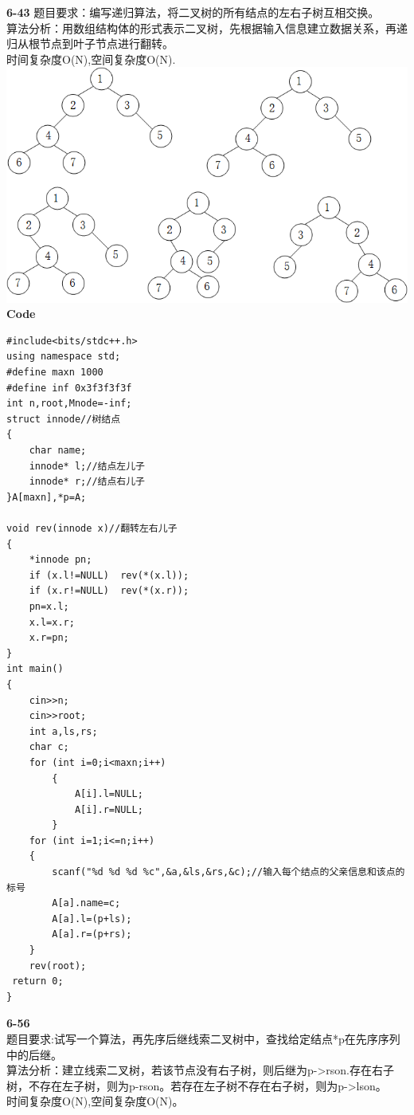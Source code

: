 \documentclass[UTF8,a4paper]{article}
\begin{document}
\textbf{6-43}
题目要求：编写递归算法，将二叉树的所有结点的左右子树互相交换。\\
算法分析：用数组结构体的形式表示二叉树，先根据输入信息建立数据关系，再递归从根节点到叶子节点进行翻转。\\
时间复杂度O(N),空间复杂度O(N).\\
\includegraphics[scale=1]{6-43.png}\\
\textbf{Code}\\
\begin{lstlisting}
#include<bits/stdc++.h>
using namespace std;
#define maxn 1000
#define inf 0x3f3f3f3f
int n,root,Mnode=-inf;
struct innode//树结点
{
    char name;
    innode* l;//结点左儿子
    innode* r;//结点右儿子
}A[maxn],*p=A;

void rev(innode x)//翻转左右儿子
{
    *innode pn;
    if (x.l!=NULL)  rev(*(x.l));
    if (x.r!=NULL)  rev(*(x.r));
    pn=x.l;
    x.l=x.r;
    x.r=pn;
}
int main()
{
    cin>>n;
    cin>>root;
    int a,ls,rs;
    char c;
    for (int i=0;i<maxn;i++)
        {
            A[i].l=NULL;
            A[i].r=NULL;
        }
    for (int i=1;i<=n;i++)
    { 
        scanf("%d %d %d %c",&a,&ls,&rs,&c);//输入每个结点的父亲信息和该点的标号
        A[a].name=c;
        A[a].l=(p+ls);
        A[a].r=(p+rs);
    }
    rev(root);
 return 0;
}
\end{lstlisting}
\textbf{6-56}\\
题目要求:试写一个算法，再先序后继线索二叉树中，查找给定结点*p在先序序列中的后继。\\
算法分析：建立线索二叉树，若该节点没有右子树，则后继为p->rson.存在右子树，不存在左子树，则为p-rson。若存在左子树不存在右子树，则为p->lson。\\
时间复杂度O(N),空间复杂度O(N)。\\
\end{document}
